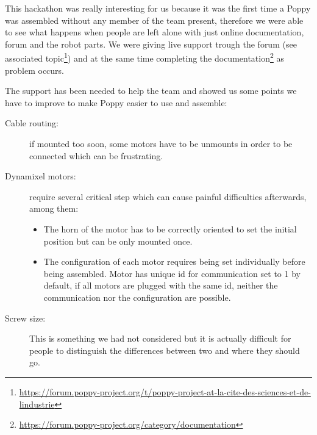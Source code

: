 This hackathon was really interesting for us because it was the first time a Poppy was assembled without any member of the team present, therefore we were able to see what happens when people are left alone with just online documentation, forum and the robot parts.
We were giving live support trough the forum (see associated topic\footnote{\url{https://forum.poppy-project.org/t/poppy-project-at-la-cite-des-sciences-et-de-lindustrie}}) and at the same time completing the documentation\footnote{\url{https://forum.poppy-project.org/category/documentation}} as problem occurs.

\begin{figure}[p]
\centering
    \hfil
    \hfil
    \newline
    \hfil
    \newline
    \hfil
    \newline
    \hfil
    \caption{}
    \label{fig:universience_workshop}
\end{figure}

The support has been needed to help the team and showed us some points we have to improve to make Poppy easier to use and assemble:
\begin{description}
    \item[Cable routing:] if mounted too soon, some motors have to be unmounts in order to be connected which can be frustrating.
    \item[Dynamixel motors:] require several critical step which can cause painful difficulties afterwards, among them:
    \begin{itemize}
        \item The horn of the motor has to be correctly oriented to set the initial position but can be only mounted once.
        \item The configuration of each motor requires being set individually before being assembled. Motor has unique id for communication set to 1 by default, if all motors are plugged with the same id, neither the communication nor the configuration are possible.
    \end{itemize}
    \item[Screw size:] This is something we had not considered but it is actually difficult for people to distinguish the differences between two and where they should go.
\end{description}

